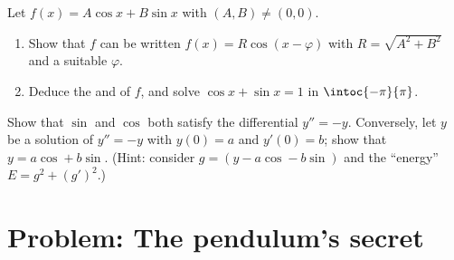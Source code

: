 \begin{exercise}[$\star\star\star$]\label{exo:g12:trigo:8}
Let $f(x) = A\cos x + B \sin x$ with $(A,B) \neq (0,0)$.
\begin{enumerate}
  \item Show that $f$ can be written $f(x) = R\cos(x - \varphi)$ with
        $R = \sqrt{A^2 + B^2}$ and a suitable $\varphi$.
  \item Deduce the  and  of $f$, and solve
        $\cos x + \sin x = 1$ in $\intoc{-\pi}{\pi}$.
\end{enumerate}
\end{exercise}

\begin{exercise}[$\star\star\star$]\label{exo:g12:trigo:9}
Show that $\sin$ and $\cos$ both satisfy the differential 
$y'' = -y$. Conversely, let $y$ be a solution of $y'' = -y$ with
$y(0) = a$ and $y'(0) = b$; show that $y = a\cos + b\sin$.
(Hint: consider $g = (y - a\cos - b\sin)$ and the ``energy''
$E = g^2 + (g')^2$.)
\end{exercise}

\section{Problem: The pendulum's secret}

